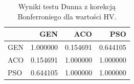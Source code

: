 \begin{table}
\caption{Wyniki testu Dunna z korekcją Bonferroniego dla wartości HV.}
\label{tab:dunn_global}
\begin{tabular}{lrrr}
\toprule
 & GEN & ACO & PSO \\
\midrule
GEN & 1.000000 & 0.154691 & 0.644105 \\
ACO & 0.154691 & 1.000000 & 1.000000 \\
PSO & 0.644105 & 1.000000 & 1.000000 \\
\bottomrule
\end{tabular}
\end{table}

